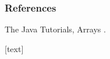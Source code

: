 \documentclass[aspectratio=169,10pt,compress]{beamer}
\begin{document}
\begin{frame}[t,fragile] \frametitle{References}
	\small The Java Tutorials, Arrays \cite{TheJavaTutorialsArray}.

	\vspace{1em}
	[text]
	
	\tiny
\end{frame}




\begin{frame}[t,fragile]
	\begin{center}
		\vspace{4cm}
	\end{center}
\end{frame}
\end{document}
